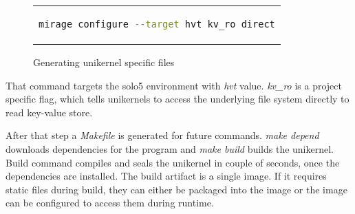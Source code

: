 \begin{figure}[htpb]
    \centering
    \begin{tabular}{c}
    \begin{lstlisting}[language=bash]
      mirage configure --target hvt kv_ro direct
  \end{lstlisting}
  \end{tabular}
  \caption{Generating unikernel specific files}\label{fig:mirage_configure}
\end{figure}

That command targets the solo5 environment with \textit{hvt} value. \textit{kv\_ro} is a project specific flag, which tells unikernels to access the underlying file system directly to read key-value store.

After that step a \textit{Makefile} is generated for future commands. \textit{make depend} downloads dependencies for the program and \textit{make build} builds the unikernel. Build command compiles and seals the unikernel in couple of seconds, once the dependencies are installed. The build artifact is a single image. If it requires static files during build, they can either be packaged into the image or the image can be configured to access them during runtime.